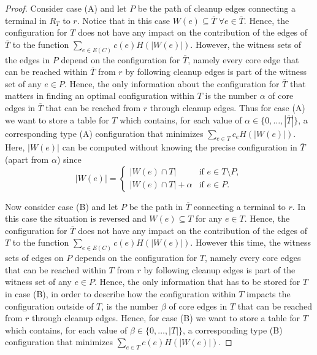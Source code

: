 \documentclass[11pt, letterpaper]{article}
\theoremstyle{definition}
\begin{document}
\begin{proof}
Consider case (A) and let $P$ be the path of cleanup edges
connecting a terminal in $R_T$ to $r$.
Notice that in this case
$W(e)\subseteq \overline{T}\; \forall e\in \overline{T}$.
Hence, the configuration for $T$ does
not have any impact on the contribution of the edges of $\overline{T}$
to the function $\sum_{e\in E(C)}c(e)H(|W(e)|)$.
However, the witness sets of the edges in $P$ depend on the
configuration for $\overline{T}$, namely every
core edge that can be reached within $\overline{T}$ from $r$ by
following cleanup edges is part of the witness set of any
$e\in P$. Hence, the only information about the configuration for $\overline{T}$
that matters in finding an optimal configuration within $T$
is the number $\alpha$ of core edges in $\overline{T}$ that can be reached
from $r$ through cleanup edges.
Thus for case (A) we want to store a table for $T$ which contains, for
each value of $\alpha\in\{0,\dots, |\overline{T}|\}$, a 
corresponding type (A) configuration that minimizes
$\sum_{e\in T} c_e H(|W(e)|)$.
Here, $|W(e)|$ can be computed
without knowing the precise configuration in $\overline{T}$
(apart from $\alpha$) since
\begin{equation*}
|W(e)| =
\begin{cases}
|W(e)\cap T|         & \text{if } e\in T\setminus P,\\
|W(e)\cap T| +\alpha & \text{if } e\in P.
\end{cases}
\end{equation*}


Now consider case (B) and let $P$ be the path in $\overline{T}$
connecting a terminal to $r$.
In this case the situation is reversed and $W(e)\subseteq T$
for any $e\in T$.
Hence, the configuration for $\overline{T}$
does not have any impact on the contribution of the edges of $T$
to the function $\sum_{e\in E(C)}c(e)H(|W(e)|)$.
However this time, the witness sets of edges on $P$ depends on the
configuration for $T$, namely every
core edges that can be reached within $T$ from $r$ by
following cleanup edges is part of the witness set of any
$e\in P$. Hence, the only information that has to be stored
for $T$ in case (B), in order to describe how the configuration
within $T$ impacts the configuration outside of $T$,
is the number $\beta$ of core edges in $T$ that can be reached
from $r$ through cleanup edges.
Hence, for case (B) we want to store a table for $T$ which contains, for
each value of $\beta\in\{0,\dots, |T|\}$, a corresponding 
type (B) configuration that minimizes
$\sum_{e\in T} c(e) H(|W(e)|)$.


\end{proof}
\end{document}
